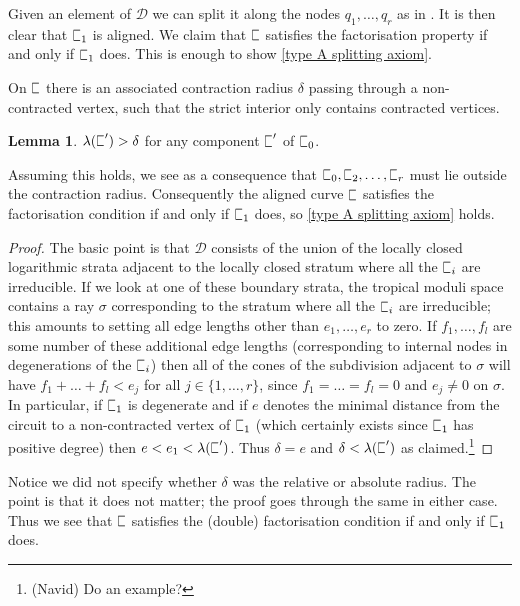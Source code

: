 \documentclass[11pt]{amsart}
\newcommand{\sqC}{\scalebox{0.8}[1.3]{$\sqsubset$}}
\newcommand{\Dcal}{\mathcal{D}}
\theoremstyle{definition}
\newtheorem{lemma}[thm]{Lemma}
\theoremstyle{definition}
\begin{document}
Given an element of $\Dcal$ we can split it along the nodes $q_1,\ldots,q_r$ as in \cite{PuncturedMaps}. It is then clear that $\sqC_1$ is aligned. We claim that $\sqC$ satisfies the factorisation property if and only if $\sqC_1$ does. This is enough to show \eqref{type A splitting axiom}.

On $\sqC$ there is an associated contraction radius $\delta$ passing through a non-contracted vertex, such that the strict interior only contains contracted vertices.
\begin{lemma}\label{type A radius lemma}$\lambda(\sqC^\prime) > \delta$ for any component $\sqC^\prime$ of $\sqC_0$.\end{lemma}
\noindent Assuming this holds, we see as a consequence that $\sqC_0,\sqC_2,\ldots,\sqC_r$ must lie outside the contraction radius. Consequently the aligned curve $\sqC$ satisfies the factorisation condition if and only if $\sqC_1$ does, so \eqref{type A splitting axiom} holds.

\begin{proof} The basic point is that $\Dcal$ consists of the union of the locally closed logarithmic strata adjacent to the locally closed stratum where all the $\sqC_i$ are irreducible. If we look at one of these boundary strata, the tropical moduli space contains a ray $\sigma$ corresponding to the stratum where all the $\sqC_i$ are irreducible; this amounts to setting all edge lengths other than $e_1,\ldots,e_r$ to zero. If $f_1,\ldots,f_l$ are some number of these additional edge lengths (corresponding to internal nodes in degenerations of the $\sqC_i$) then all of the cones of the subdivision adjacent to $\sigma$ will have $f_1+\ldots+f_l < e_j$ for all $j\in\{1,\ldots,r\}$, since $f_1=\ldots=f_l=0$ and $e_j \neq 0$ on $\sigma$. In particular, if $\sqC_1$ is degenerate and if $e$ denotes the minimal distance from the circuit to a non-contracted vertex of $\sqC_1$ (which certainly exists since $\sqC_1$ has positive degree) then $e < e_1 < \lambda(\sqC^\prime)$. Thus $\delta=e$ and $\delta < \lambda(\sqC^\prime)$ as claimed.\footnote{(Navid) Do an example?}\end{proof}
Notice we did not specify whether $\delta$ was the relative or absolute radius. The point is that it does not matter; the proof goes through the same in either case. Thus we see that $\sqC$ satisfies the (double) factorisation condition if and only if $\sqC_1$ does.
\end{document}
